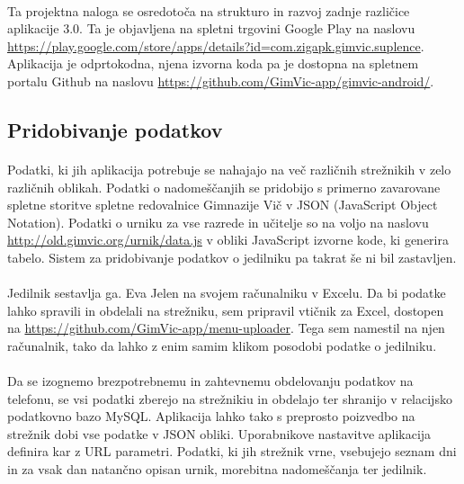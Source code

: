 \paragraph{}Ta projektna naloga se osredotoča na strukturo in razvoj zadnje različice aplikacije 3.0. Ta je objavljena na spletni trgovini Google Play na naslovu \url{https://play.google.com/store/apps/details?id=com.zigapk.gimvic.suplence}. Aplikacija je odprtokodna, njena izvorna koda pa je dostopna na spletnem portalu Github na naslovu \url{https://github.com/GimVic-app/gimvic-android/}.

\subsection{Pridobivanje podatkov}
\paragraph{}Podatki, ki jih aplikacija potrebuje se nahajajo na več različnih strežnikih v zelo različnih oblikah. Podatki o nadomeščanjih se pridobijo s primerno zavarovane spletne storitve spletne redovalnice Gimnazije Vič v JSON\cite{json-wiki} (JavaScript Object Notation). Podatki o urniku za vse razrede in učitelje so na voljo na naslovu \url{http://old.gimvic.org/urnik/data.js} v obliki JavaScript izvorne kode, ki generira tabelo. Sistem za pridobivanje podatkov o jedilniku pa takrat še ni bil zastavljen.

\paragraph{}Jedilnik sestavlja ga. Eva Jelen na svojem računalniku v Excelu. Da bi podatke lahko spravili in obdelali na strežniku, sem pripravil vtičnik za Excel, dostopen na \url{https://github.com/GimVic-app/menu-uploader}. Tega sem namestil na njen računalnik, tako da lahko z enim samim klikom posodobi podatke o jedilniku.

\paragraph{}Da se izognemo brezpotrebnemu in zahtevnemu obdelovanju podatkov na telefonu, se vsi podatki zberejo na strežnikiu in obdelajo ter shranijo v relacijsko podatkovno bazo MySQL\cite{mysql-wiki}. Aplikacija lahko tako s preprosto poizvedbo na strežnik dobi vse podatke v JSON\cite{json-wiki} obliki. Uporabnikove nastavitve aplikacija definira kar z URL parametri\cite{query-wiki}. Podatki, ki jih strežnik vrne, vsebujejo seznam dni in za vsak dan natančno opisan urnik, morebitna nadomeščanja ter jedilnik.

